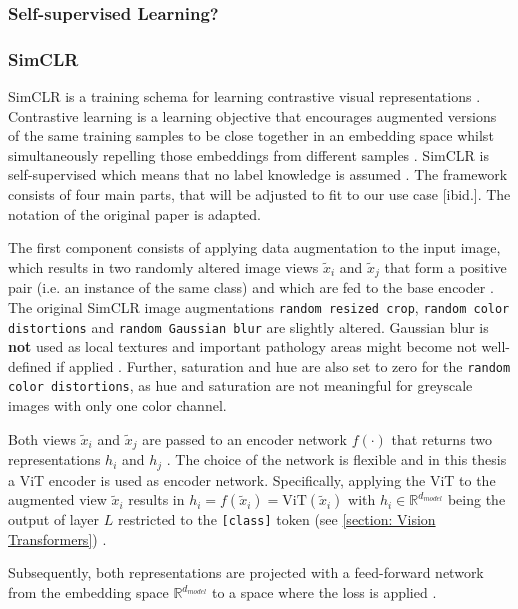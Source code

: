 \subsubsection{Self-supervised Learning?}
\subsubsection{SimCLR}
\label{section: SimCLR}
SimCLR is a training schema for learning contrastive visual representations \citep{Chen2020}.
Contrastive learning is a learning objective that encourages augmented versions of the same training samples to be close together in an embedding space whilst simultaneously repelling those embeddings from different samples \citep{Jaiswal2020}.
SimCLR is self-supervised which means that no label knowledge is assumed \citep{Chen2020}.
The framework consists of four main parts, that will be adjusted to fit to our use case [ibid.].
The notation of the original paper is adapted.
\par
The first component consists of applying data augmentation to the input image, which results in two randomly altered image views $\tilde{x}_i$ and $\tilde{x}_j$ that form a positive pair (i.e. an instance of the same class) and which are fed to the base encoder \citep{Chen2020}.
The original SimCLR image augmentations \texttt{random resized crop}, \texttt{random color distortions} and \texttt{random Gaussian blur} are slightly altered.
Gaussian blur is \textbf{not} used as local textures and important pathology areas might become not well-defined if applied \citep{Azizi2021}.
Further, saturation and hue are also set to zero for the \texttt{random color distortions}, as hue and saturation are not meaningful for greyscale images with only one color channel.
\par
Both views $\tilde{x}_i$ and $\tilde{x}_j$ are passed to an encoder network $f(\cdot)$ that returns two representations $h_i$ and $h_j$ \citep{Chen2020}.
The choice of the network is flexible and in this thesis a ViT encoder is used as encoder network.
Specifically, applying the ViT to the augmented view $\tilde{x}_i$ results in $h_i = f(\tilde{x}_i) = \text{ViT}(\tilde{x}_i)$ with $h_i \in \mathbb{R}^{d_{model}}$ being the output of layer $L$ restricted to the \texttt{[class]} token (see \ref{section: Vision Transformers}) \citep{Chen2020}.
\par
Subsequently, both representations are projected with a feed-forward network from the embedding space $\mathbb{R}^{d_{model}}$ to a space where the loss is applied \citep{Chen2020}.
